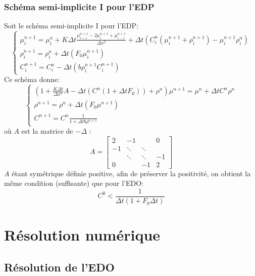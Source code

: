 \documentclass[11pt]{article}
\newcommand{\Dt}{\Delta t}
\newcommand{\Dx}{\Delta x}
\begin{document}
\subsubsection{Schéma semi-implicite I pour l'EDP}
Soit le schéma semi-implicite I pour l'EDP:
\begin{equation} \boxed{\left\{
                \begin{array}{ll}
                   \mu^{n+1}_i = \mu^{n}_i+ K\Dt \frac{\mu^{n+1}_{i+1}-2\mu^{n+1}_i+\mu^{n+1}_{i-1}}{\Dx ^2} + \Dt( C^{n}_i(\mu^{n+1}_i + \rho^{n+1}_i) -\mu^{n+1}_i\rho^{n}_i)\\
                \rho^{n+1}_i=  \rho^{n}_i+ \Dt (F_0 \mu^{n+1}_i) \\
                 C^{n+1}_i =C^{n}_i- \Dt(b\rho^{n+1}_iC^{n+1}_i)
                \end{array}
              \right.}
\end{equation}
Ce schéma donne:
\begin{equation*} \left\{
                \begin{array}{ll}
                   (1+\frac{K\Dt}{\Dx^2}A-\Dt(C^{n}(1+\Dt F_0)) + \rho^{n})\mu^{n+1} = \mu^{n}+  \Dt C^{n}\rho^{n} \\
                \rho^{n+1}=  \rho^{n}+ \Dt (F_0 \mu^{n+1}) \\
                 C^{n+1} = C^{n}\frac{1}{1+ \Dt b\rho^{n+1}}
                \end{array}
              \right.
\end{equation*}
où $A$ est la matrice de $-\Delta$
:\begin{equation}  \label{myeq}A= \left[ \begin{matrix}2 & -1 & & 0\\-1 & \ddots & \ddots &  \\& \ddots & \ddots &  -1 \\0 &  & -1 & 2  \end{matrix}  \right]\end{equation}
$A$ étant symétrique définie positive, afin de préserver la positivité, on obtient la même condition (suffisante) que pour l'EDO:
\begin{equation}
	\boxed{C^0< \frac{1}{\Dt(1+F_0\Dt)}}
\end{equation}
\newpage
\section{Résolution numérique}
\subsection{Résolution de l'EDO}
\end{document}
